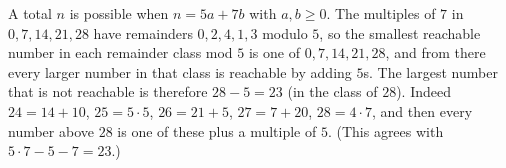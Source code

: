 A total $n$ is possible when $n=5a+7b$ with $a,b\ge0$. The multiples of $7$ in $0,7,14,21,28$ have remainders $0,2,4,1,3$ modulo $5$, so the smallest reachable number in each remainder class mod $5$ is one of $0,7,14,21,28$, and from there every larger number in that class is reachable by adding $5$s. The largest number that is not reachable is therefore $28-5=\boxed{23}$ (in the class of $28$). Indeed $24=14+10$, $25=5\cdot5$, $26=21+5$, $27=7+20$, $28=4\cdot7$, and then every number above $28$ is one of these plus a multiple of $5$. (This agrees with $5\cdot7-5-7=23$.)
